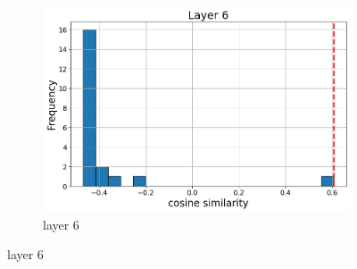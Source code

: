 \documentclass[11pt]{article}
\begin{document}
\begin{figure}[t]
\begin{subfigure}[t]{0.24\textwidth}
    \includegraphics[width=1.4\columnwidth]{figures/obs2_appendix/obs2_layer6.png}
    \caption{layer 6}
  \end{subfigure}\hfill
    \vspace{2mm}


\end{figure}
\end{document}
